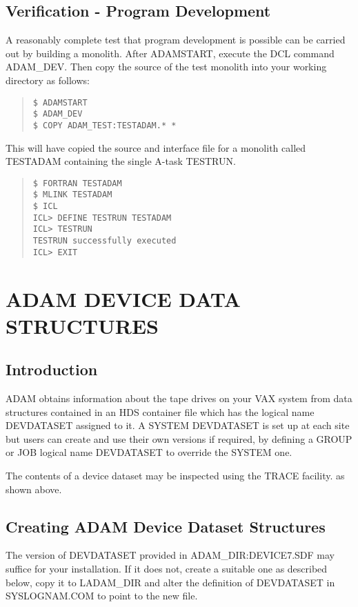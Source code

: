 \subsection{Verification - Program Development}
A reasonably complete test that program development is possible can be
carried out by building a monolith.
After ADAMSTART, execute the DCL command ADAM\_DEV. Then copy the source
of the test monolith into your working directory as follows:
\small \begin{quote}
\begin{verbatim}
$ ADAMSTART
$ ADAM_DEV
$ COPY ADAM_TEST:TESTADAM.* *
\end{verbatim}
\end{quote} \normalsize
This will have copied the source and interface file for a monolith
called TESTADAM containing the single A-task TESTRUN.
\small \begin{quote}
\begin{verbatim}
$ FORTRAN TESTADAM
$ MLINK TESTADAM
$ ICL
ICL> DEFINE TESTRUN TESTADAM
ICL> TESTRUN
TESTRUN successfully executed
ICL> EXIT
\end{verbatim}
\end{quote} \normalsize

\section{ADAM DEVICE DATA STRUCTURES}
\label{devdataset}
\subsection{Introduction}
ADAM obtains information about the tape drives on your VAX system from data
structures contained in an HDS container file which has the logical name
DEVDATASET assigned to it.
A SYSTEM DEVDATASET is set up at each site but users can create
and use their own versions if required, by defining a GROUP or JOB logical
name DEVDATASET to override the SYSTEM one.

The contents of a device dataset may be inspected using the TRACE facility.
as shown above.

\subsection{Creating ADAM Device Dataset Structures}
The version of DEVDATASET provided in ADAM\_DIR:DEVICE7.SDF may suffice for
your installation. If it does not, create a suitable one as described
below, copy it to LADAM\_DIR and alter the definition of DEVDATASET in
SYSLOGNAM.COM to point to the new file.

